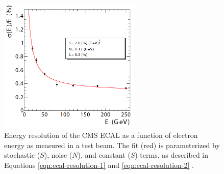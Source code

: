 \begin{figure}
  \centering
  \includegraphics[width=0.6\textwidth]{tex/cms/fig/ecal-resolution.png}
  \caption{Energy resolution of the CMS ECAL as a function of electron energy as measured in a test beam.
    The fit (red) is parameterized by stochastic ($S$), noise ($N$), and constant ($S$) terms, as described
    in Equations \ref{eqn:ecal-resolution-1} and \ref{eqn:ecal-resolution-2} \cite{cms-jinst}.}
  \label{fig:ecal-resolution}
\end{figure}

